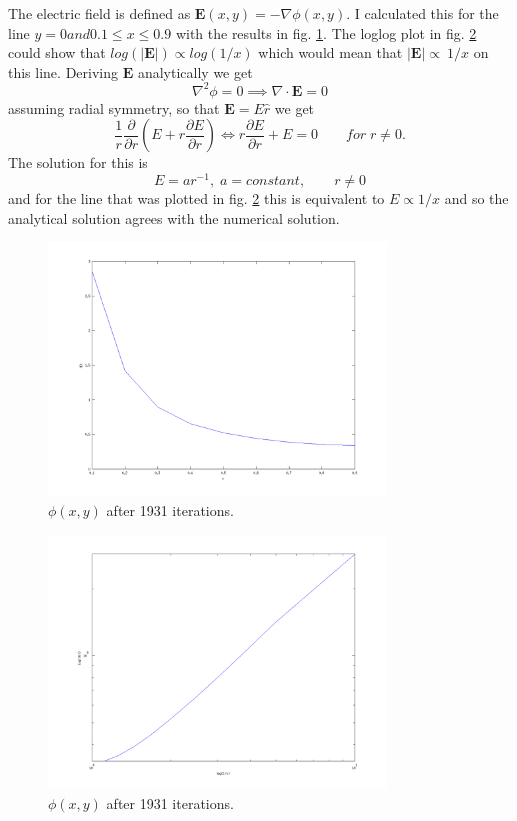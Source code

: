 The electric field is defined as $\mathbf{E}(x,y) = -\nabla \phi(x,y)$. I calculated this for the line 
$y=0 and 0.1 \le x \le 0.9$ with the results in fig. \ref{fig:exc1_E}. The loglog plot in fig. \ref{fig:exc1_logE} could show that 
$log(|\mathbf{E}|) \propto log(1/x)$ which would mean that $|\mathbf{E}| \propto \ 1/x$ on this line.
Deriving $\mathbf{E}$ analytically we get
\[
\nabla^2 \phi = 0 \implies \nabla \cdot \mathbf{E} = 0
\]
assuming radial symmetry, so that $\mathbf{E} = E \hat{r}$ we get
\[
\frac{1}{r} \frac{\partial}{\partial r} \left( E + r \frac{\partial E}{\partial r} \right)
\iff r \frac{\partial E}{\partial r} + E = 0 \qquad for \; r \neq 0.
\]
The solution for this is 
\begin{equation}
E = a r^{-1}, \; a=constant, \qquad r \neq 0
\end{equation}
and for the line that was plotted in fig. \ref{fig:exc1_logE} this is equivalent to $E \propto 1/x$ and so the analytical
solution agrees with the numerical solution.
\begin{figure}[h!]
	\centering
	\includegraphics[width=0.8\textwidth]{img/exc1_E}
	\caption{$\phi(x,y)$ after 1931 iterations.}
	\label{fig:exc1_E}
\end{figure}
\begin{figure}[h!]
	\centering
	\includegraphics[width=0.8\textwidth]{img/exc1_logE}
	\caption{$\phi(x,y)$ after 1931 iterations.}
	\label{fig:exc1_logE}
\end{figure}

